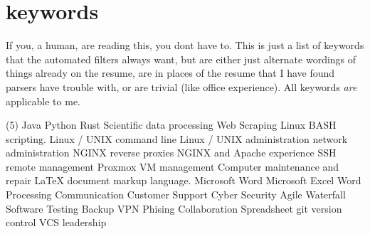 \documentclass[letterpaper,10pt]{article}
\begin{document}
	\newpage
\section*{keywords}
	{\small
	If you, a human, are reading this, you dont have to. This is just a list of keywords that the automated filters always want, but are either just alternate wordings of things already on the resume, are in places of the resume that I have found parsers have trouble with, or are trivial (like office experience). All keywords \emph{are} applicable to me.
	\tiny
	\begin{tasks}[style=itemize](5)
			\task Java
			\task Python
			\task Rust
			\task Scientific data processing
			\task Web Scraping
			\task Linux BASH scripting.
			\task Linux / UNIX command line
			\task Linux / UNIX administration
			\task network administration
			\task NGINX reverse proxies
			\task NGINX and Apache experience
			\task SSH remote management
			\task Proxmox VM management
			\task Computer maintenance and repair
			\task LaTeX document markup language.
			\task Microsoft Word
			\task Microsoft Excel
			\task Word Processing
			\task Communication
			\task Customer Support
			\task Cyber Security
			\task Agile
			\task Waterfall
			\task Software Testing
			\task Backup
			\task VPN
			\task Phising
			\task Collaboration
			\task Spreadsheet
			\task git
			\task version control
			\task VCS
			\task leadership
	\end{tasks}
	}
\end{document}
